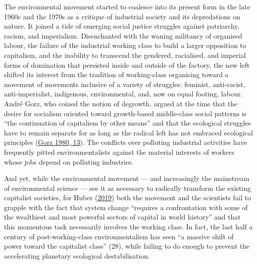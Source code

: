 \documentclass[a4paper, nobind]{templates/ociamthesis}
\begin{document}
The environmental movement started to coalesce into its present form in the late 1960s and the 1970s as a critique of industrial society and its depredations on nature. It joined a tide of emerging social justice struggles against patriarchy, racism, and imperialism. Disenchanted with the waning militancy of organised labour, the failure of the industrial working class to build a larger opposition to capitalism, and the inability to transcend the gendered, racialised, and imperial forms of domination that persisted inside and outside of the factory, the new left shifted its interest from the tradition of working-class organising toward a movement of movements inclusive of a variety of struggles: feminist, anti-racist, anti-imperialist, indigenous, environmental, and, now on equal footing, labour. André Gorz, who coined the notion of degrowth, argued at the time that the desire for socialism oriented toward growth-based middle-class social patterns is ``the continuation of capitalism by other means'' and that the ecological struggles have to remain separate for as long as the radical left has not embraced ecological principles (\protect\hyperlink{ref-gorz_ecology_1980}{Gorz 1980, 13}). The conflicts over polluting industrial activities have frequently pitted environmentalists against the material interests of workers whose jobs depend on polluting industries.

And yet, while the environmental movement --- and increasingly the mainstream of environmental science --- see it as necessary to radically transform the existing capitalist societies, for Huber (\protect\hyperlink{ref-huber_ecological_2019}{2019}) both the movement and the scientists fail to grapple with the fact that system change ``requires a confrontation with some of the wealthiest and most powerful sectors of capital in world history'' and that this momentous task necessarily involves the working class. In fact, the last half a century of post-working-class environmentalism has seen ``a massive shift of power toward the capitalist class'' (28), while failing to do enough to prevent the accelerating planetary ecological destabilisation.
\end{document}
